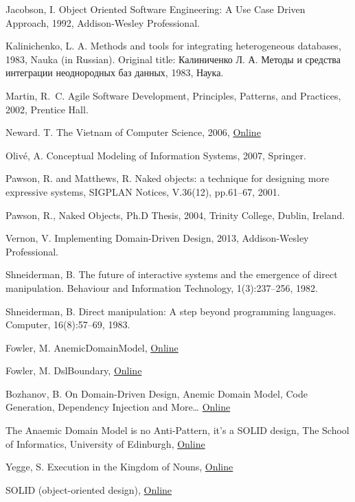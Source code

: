 \documentclass[a4paper,12pt,oneside,openright,final]{memoir} %
\begin{document}
\begin{thebibliography}{5}
Jacobson, I. Object Oriented Software Engineering: A Use Case Driven Approach, 1992, Addison-Wesley Professional.

Kalinichenko, L. A. Methods and tools for integrating heterogeneous databases, 1983, Nauka (in Russian).
\foreignlanguage{russian}{Original title: Калиниченко Л. А. Методы и средства интеграции неоднородных баз данных, 1983, Наука.}

Martin, R.~C. Agile Software Development, Principles, Patterns, and Practices, 2002, Prentice Hall.

New\-ard. T. The Vietnam of Computer Science, 2006,
\href{http://blogs.tedneward.com/2006/06/26/The+Vietnam+Of+Computer+Science.aspx}{Online}

Oliv\'{e}, A. Conceptual Modeling of Information Systems, 2007, Springer.

Pawson, R. and Matthews, R. Naked objects: a technique for designing more expressive systems, SIGPLAN Notices, V.36(12), pp.61--67, 2001.

Pawson, R., Naked Objects, Ph.D Thesis, 2004, Trinity College, Dublin, Ireland.

Vernon, V. Implementing Domain-Driven Design, 2013, Addison-Wesley Professional.

Shneiderman, B. The future of interactive systems and the emergence of direct manipulation. Behaviour and Information Technology, 1(3):237–256, 1982.

Shneiderman, B. Direct manipulation: A step beyond programming languages. Computer, 16(8):57–69, 1983.

 Fowler, M. AnemicDomainModel, 
\href{http://www.martinfowler.com/bliki/AnemicDomainModel.html}{Online}

 Fowler, M. DslBoundary, 
\href{http://martinfowler.com/bliki/DslBoundary.html}{Online}

 Bozhanov, B. On Domain-Driven Design, Anemic Domain Model, Code Generation, Dependency Injection and More…
\href{http://techblog.bozho.net/on-domain-driven-design-anemic-domain-models-code-generation-dependency-injection-and-more/}{Online}

  The Anaemic Domain Model is no Anti-Pattern, it’s a SOLID design, The School of Informatics, University of Edinburgh,
\href{https://blog.inf.ed.ac.uk/sapm/2014/02/04/the-anaemic-domain-model-is-no-anti-pattern-its-a-solid-design/}{Online}

 Yegge, S. Execution in the Kingdom of Nouns,  
\href{http://steve-yegge.blogspot.com.au/2006/03/execution-in-kingdom-of-nouns.html}{Online}

 SOLID (object-oriented design), 
\href{https://en.wikipedia.org/wiki/SOLID_(object-oriented_design)}{Online}

\end{thebibliography}
%
\end{document}
